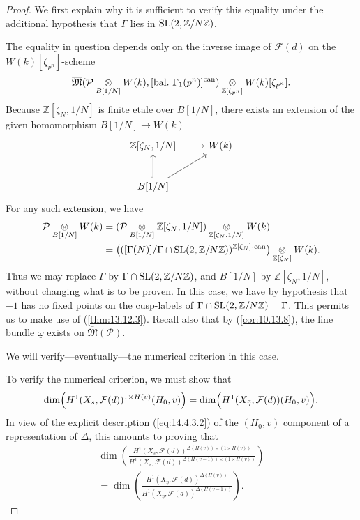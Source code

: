 \begin{proof}
\kmitem\label{item:14.5.3} We first explain why it is sufficient to verify this equality under the additional hypothesis that $\Gamma$ lies in $\operatorname{SL}(2, \mathbb{Z}/N\mathbb{Z})$.

The equality in question depends only on the inverse image of $\mathcal{F}(d)$ on the $W(k)[\zeta_{p^n}]$-scheme
\[
\overline{\mathfrak{M}}(\mathcal{P} \underset{B[1/N]}{\otimes} W(k), [\mathrm{bal.}\ \Gamma_1(p^n)]^{\mathrm{can}}) \underset{\mathbb{Z}[\zeta_{p^n}]}{\otimes} W(k)[\zeta_{p^n}] .
\]
Because $\mathbb{Z}[\zeta_N, 1/N]$ is finite etale over $B[1/N]$, there exists an extension of the given homomorphism $B[1/N] \to W(k)$
\[
\begin{tikzcd}[row sep=2.5em, column sep=2.5em]
\mathbb{Z}[\zeta_N, 1/N] \arrow[r] & W(k) \\
B[1/N] \arrow[u, hook] \arrow[ur] &
\end{tikzcd}
\]
For any such extension, we have
\begin{align*}
\mathcal{P} \underset{B[1/N]}{\otimes} W(k) &= (\mathcal{P} \underset{B[1/N]}{\otimes} \mathbb{Z}[\zeta_N, 1/N]) \underset{\mathbb{Z}[\zeta_N, 1/N]}{\otimes} W(k) \\
&= \bigl( ([\Gamma(N)]/\Gamma \cap \operatorname{SL}(2, \mathbb{Z}/N\mathbb{Z}))^{\mathbb{Z}[\zeta_N]\text{-}\mathrm{can}} \bigr) \underset{\mathbb{Z}[\zeta_N]}{\otimes} W(k) .
\end{align*}
Thus we may replace $\Gamma$ by $\Gamma \cap \operatorname{SL}(2, \mathbb{Z}/N\mathbb{Z})$, and $B[1/N]$ by $\mathbb{Z}[\zeta_N, 1/N]$, without changing what is to be proven. In this case, we have by hypothesis that $-1$ has no fixed points on the cusp-labels of $\Gamma \cap \operatorname{SL}(2, \mathbb{Z}/N\mathbb{Z}) = \Gamma$. This permits us to make use of (\ref{thm:13.12.3}). Recall also that by (\ref{cor:10.13.8}), the line bundle $\underline{\omega}$ exists on $\overline{\mathfrak{M}}(\mathcal{P})$.

We will verify---eventually---the numerical criterion in this case.

\kmitem\label{item:14.5.4} To verify the numerical criterion, we must show that
\begin{equation}\label{eq:14.5.4.1}
\dim \Bigl( H^1(X_s, \mathcal{F}(d))^{1 \times H(v)}(H_0, v) \Bigr) = \dim \Bigl( H^1(X_{\bar{\eta}}, \mathcal{F}(d))(H_0, v) \Bigr) .
\end{equation}
In view of the explicit description (\ref{eq:14.4.3.2}) of the $(H_0, v)$ component of a representation of $\Delta$, this amounts to proving that
\begin{multline}\label{eq:14.5.4.2}
\dim \left( \frac{H^1(X_s, \mathcal{F}(d))^{\Delta(H(v)) \times (1 \times H(v))}}{H^1(X_s, \mathcal{F}(d))^{\Delta(H(v-1)) \times (1 \times H(v))}} \right) \\
= \dim \left( \frac{H^1(X_{\bar{\eta}}, \mathcal{F}(d))^{\Delta(H(v))}}{H^1(X_{\bar{\eta}}, \mathcal{F}(d))^{\Delta(H(v-1))}} \right) .
\end{multline}


\end{proof}
